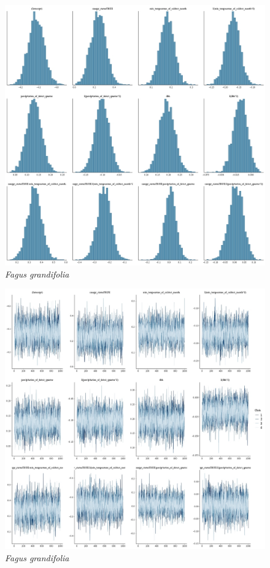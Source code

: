 \documentclass[letterpaper, 12pt]{article}
\begin{document}
\begin{figure}
	\centering
	\includegraphics[scale=0.4]{./19462-FAG-GRA_hist}
	\caption{\textit{Fagus grandifolia}}
\end{figure}

\begin{figure}
	\centering
	\includegraphics[scale=0.4]{./19462-FAG-GRA_traces}
	\caption{\textit{Fagus grandifolia}}
\end{figure}
\end{document}
